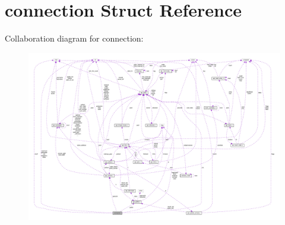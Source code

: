 \hypertarget{structconnection}{}\section{connection Struct Reference}
\label{structconnection}


Collaboration diagram for connection\+:
\nopagebreak
\begin{figure}[H]
\begin{center}
\leavevmode
\includegraphics[width=350pt]{structconnection__coll__graph}
\end{center}
\end{figure}
